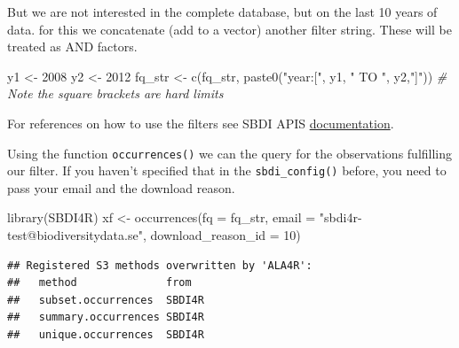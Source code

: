 \documentclass[
  10pt,
]{article}
\newenvironment{Shaded}{\begin{snugshade}}{\end{snugshade}}
\newcommand{\AttributeTok}[1]{\textcolor[rgb]{0.77,0.63,0.00}{#1}}
\newcommand{\CommentTok}[1]{\textcolor[rgb]{0.56,0.35,0.01}{\textit{#1}}}
\newcommand{\DecValTok}[1]{\textcolor[rgb]{0.00,0.00,0.81}{#1}}
\newcommand{\FunctionTok}[1]{\textcolor[rgb]{0.00,0.00,0.00}{#1}}
\newcommand{\NormalTok}[1]{#1}
\newcommand{\OtherTok}[1]{\textcolor[rgb]{0.56,0.35,0.01}{#1}}
\newcommand{\SpecialCharTok}[1]{\textcolor[rgb]{0.00,0.00,0.00}{#1}}
\newcommand{\StringTok}[1]{\textcolor[rgb]{0.31,0.60,0.02}{#1}}
\begin{document}
But we are not interested in the complete database, but on the last 10 years of data. for this we concatenate (add to a vector) another filter string. These will be treated as AND factors.

\begin{Shaded}
\begin{Highlighting}[]
\NormalTok{y1 }\OtherTok{\textless{}{-}} \DecValTok{2008}
\NormalTok{y2 }\OtherTok{\textless{}{-}} \DecValTok{2012}
\NormalTok{fq\_str }\OtherTok{\textless{}{-}} \FunctionTok{c}\NormalTok{(fq\_str, }\FunctionTok{paste0}\NormalTok{(}\StringTok{"year:["}\NormalTok{, y1, }\StringTok{" TO "}\NormalTok{, y2,}\StringTok{"]"}\NormalTok{))}
\CommentTok{\# Note the square brackets are hard limits}
\end{Highlighting}
\end{Shaded}

For references on how to use the filters see SBDI APIS \href{https://api.biodiversitydata.se/?lang=en-US\#ws3}{documentation}.

Using the function \texttt{occurrences()} we can the query for the observations fulfilling our filter. If you haven't specified that in the \texttt{sbdi\_config()} before, you need to pass your email and the download reason.

\begin{Shaded}
\begin{Highlighting}[]
\FunctionTok{library}\NormalTok{(SBDI4R)}
\NormalTok{xf }\OtherTok{\textless{}{-}} \FunctionTok{occurrences}\NormalTok{(}\AttributeTok{fq =}\NormalTok{ fq\_str,}
                 \AttributeTok{email =} \StringTok{"sbdi4r{-}test@biodiversitydata.se"}\NormalTok{, }
                 \AttributeTok{download\_reason\_id =} \DecValTok{10}\NormalTok{)}
\end{Highlighting}
\end{Shaded}

\begin{verbatim}
## Registered S3 methods overwritten by 'ALA4R':
##   method              from  
##   subset.occurrences  SBDI4R
##   summary.occurrences SBDI4R
##   unique.occurrences  SBDI4R
\end{verbatim}

\begin{Shaded}
\end{Shaded}
\end{document}
